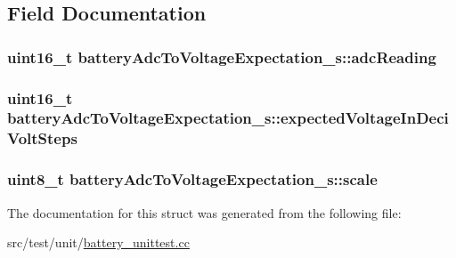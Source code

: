 \subsection{Field Documentation}
\hypertarget{structbatteryAdcToVoltageExpectation__s_a7e633e10db592bbe953e035f62d1118a}{
\subsubsection[{adc\+Reading}]{\setlength{\rightskip}{0pt plus 5cm}uint16\+\_\+t battery\+Adc\+To\+Voltage\+Expectation\+\_\+s\+::adc\+Reading}}\label{structbatteryAdcToVoltageExpectation__s_a7e633e10db592bbe953e035f62d1118a}
\hypertarget{structbatteryAdcToVoltageExpectation__s_a7e2b53232c5a8fbcf986d8996fb1c9d1}{
\subsubsection[{expected\+Voltage\+In\+Deci\+Volt\+Steps}]{\setlength{\rightskip}{0pt plus 5cm}uint16\+\_\+t battery\+Adc\+To\+Voltage\+Expectation\+\_\+s\+::expected\+Voltage\+In\+Deci\+Volt\+Steps}}\label{structbatteryAdcToVoltageExpectation__s_a7e2b53232c5a8fbcf986d8996fb1c9d1}
\hypertarget{structbatteryAdcToVoltageExpectation__s_af05fc6e746d51248cc22f7758a1b7070}{
\subsubsection[{scale}]{\setlength{\rightskip}{0pt plus 5cm}uint8\+\_\+t battery\+Adc\+To\+Voltage\+Expectation\+\_\+s\+::scale}}\label{structbatteryAdcToVoltageExpectation__s_af05fc6e746d51248cc22f7758a1b7070}


The documentation for this struct was generated from the following file\+:\begin{DoxyCompactItemize}
\item 
src/test/unit/\hyperlink{battery__unittest_8cc}{battery\+\_\+unittest.\+cc}\end{DoxyCompactItemize}
